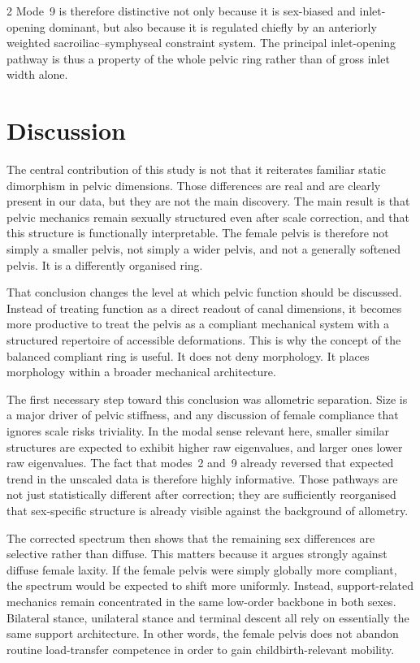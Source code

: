 \documentclass[openacc]{rsproca_new}
\begin{document}
\begin{multicols}{2}
Mode~9 is therefore distinctive not only because it is sex-biased and inlet-opening dominant, but also because it is regulated chiefly by an anteriorly weighted sacroiliac--symphyseal constraint system. The principal inlet-opening pathway is thus a property of the whole pelvic ring rather than of gross inlet width alone.

\section{Discussion}

The central contribution of this study is not that it reiterates familiar static dimorphism in pelvic dimensions. Those differences are real and are clearly present in our data, but they are not the main discovery. The main result is that pelvic mechanics remain sexually structured even after scale correction, and that this structure is functionally interpretable. The female pelvis is therefore not simply a smaller pelvis, not simply a wider pelvis, and not a generally softened pelvis. It is a differently organised ring.

That conclusion changes the level at which pelvic function should be discussed. Instead of treating function as a direct readout of canal dimensions, it becomes more productive to treat the pelvis as a compliant mechanical system with a structured repertoire of accessible deformations. This is why the concept of the balanced compliant ring is useful. It does not deny morphology. It places morphology within a broader mechanical architecture.

The first necessary step toward this conclusion was allometric separation. Size is a major driver of pelvic stiffness, and any discussion of female compliance that ignores scale risks triviality. In the modal sense relevant here, smaller similar structures are expected to exhibit higher raw eigenvalues, and larger ones lower raw eigenvalues. The fact that modes~2 and~9 already reversed that expected trend in the unscaled data is therefore highly informative. Those pathways are not just statistically different after correction; they are sufficiently reorganised that sex-specific structure is already visible against the background of allometry.

The corrected spectrum then shows that the remaining sex differences are selective rather than diffuse. This matters because it argues strongly against diffuse female laxity. If the female pelvis were simply globally more compliant, the spectrum would be expected to shift more uniformly. Instead, support-related mechanics remain concentrated in the same low-order backbone in both sexes. Bilateral stance, unilateral stance and terminal descent all rely on essentially the same support architecture. In other words, the female pelvis does not abandon routine load-transfer competence in order to gain childbirth-relevant mobility.


\end{multicols}
\end{document}
